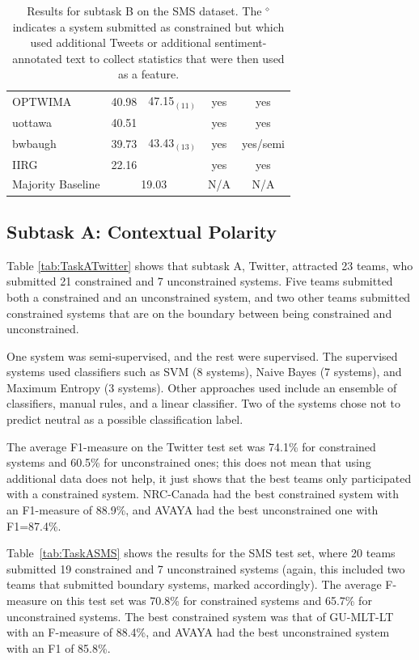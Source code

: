\begin{table}[t!]
\begin{small}
\begin{tabular}{l@{ }c@{ }c@{ }c@{ }c}
    OPTWIMA & 40.98 & 47.15$_{(11)}$ & yes & yes\\
    uottawa & 40.51 &  & yes & yes\\
    bwbaugh & 39.73 & 43.43$_{(13)}$ & yes & yes/semi\\
    IIRG & 22.16 &  & yes & yes\\
       \hline
    Majority Baseline & \multicolumn{2}{c}{19.03}  & N/A & N/A \\
    \hline
    \end{tabular}
    \end{small}
    \caption{\label{tab:TaskBSMS}Results for subtask B on the SMS dataset.
             The $^\diamond$ indicates a system submitted as constrained but which used additional Tweets or additional sentiment-annotated text
             to collect statistics that were then used as a feature.}
  \end{table}


\subsection{Subtask A: Contextual Polarity}

Table \ref{tab:TaskATwitter} shows that subtask A, Twitter,
attracted 23 teams, who submitted 21 constrained and 7 unconstrained systems.
Five teams submitted both a constrained and an unconstrained system,
and two other teams submitted constrained systems that are on the boundary between being constrained and unconstrained.

One system was semi-supervised, and the rest were supervised.
The supervised systems used classifiers such as SVM (8 systems), Naive Bayes (7 systems), and Maximum Entropy (3 systems). Other approaches used include an ensemble of classifiers, manual rules, and a linear classifier. Two of the systems chose not to predict neutral as a possible classification label.


The average F1-measure on the Twitter test set was 74.1\% for constrained systems and 60.5\% for unconstrained ones; this does not mean that using additional data does not help, it just shows that the best teams only participated with a constrained system.
NRC-Canada had the best constrained system with an F1-measure of 88.9\%, and AVAYA had the best unconstrained one with F1=87.4\%.

Table~\ref{tab:TaskASMS} shows the results for the SMS test set,
where 20 teams submitted 19 constrained and 7 unconstrained systems
(again, this included two teams that submitted boundary systems, marked accordingly).
The average F-measure on this test set was 70.8\% for constrained systems and 65.7\% for unconstrained systems. The best constrained system was that of GU-MLT-LT with an F-measure of 88.4\%, and AVAYA had the best unconstrained system with an F1 of 85.8\%.

